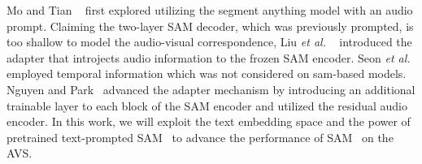Mo and Tian ~\cite{mo2023av} first explored utilizing the segment anything model with an audio prompt. Claiming the two-layer SAM decoder, which was previously prompted, is too shallow to model the audio-visual correspondence, Liu \textit{et al.} ~\cite{liu2024annotation} introduced the adapter that introjects audio information to the frozen SAM encoder. Seon \textit{et al.} \cite{seon2024extending} employed temporal information which was not considered on sam-based models. 
Nguyen and Park~\cite{nguyen2024save} advanced the adapter mechanism by introducing an additional trainable layer to each block of the SAM encoder and utilized the residual audio encoder. In this work, we will exploit the text embedding space and the power of pretrained text-prompted SAM~\cite{zhang2024evfsam} to advance the performance of SAM~\cite{kirillov2023sam} on the AVS.




